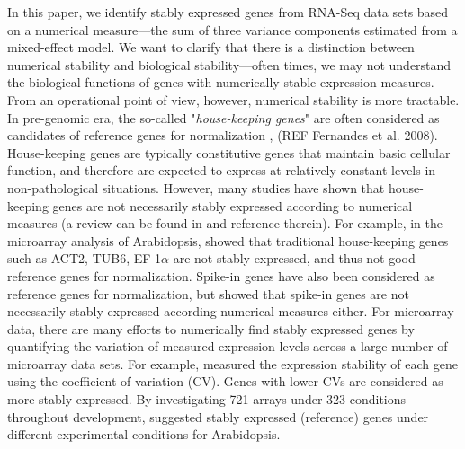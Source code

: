 \documentclass[letterpaper,12pt]{article}
\begin{document}
In this paper, we identify stably expressed genes from RNA-Seq data sets based
on a numerical measure---the sum of three variance components estimated from a
mixed-effect model.  We want to clarify that there is a distinction between
numerical stability and biological stability---often times, we may not
understand the biological functions of genes with numerically stable
expression measures.  From an operational point of view, however, numerical
stability is more tractable. In pre-genomic era, the so-called "\textit{house-keeping
genes}" are often considered as candidates of reference genes for
normalization \citep{bustin2002quantification, andersen2004normalization},
(REF Fernandes et al.  2008). House-keeping
genes are typically constitutive genes that
maintain basic cellular function, and therefore are expected to express at
relatively constant levels in non-pathological situations.  However, many
studies have shown that house-keeping
genes are not necessarily stably expressed according to
numerical measures (a review can be found in \cite{huggett2005real} and
reference therein).  For example, in the microarray analysis of Arabidopsis, \cite{czechowski2005genome}
showed that traditional house-keeping
genes such as ACT2, TUB6, EF-1$\alpha$ are not stably
expressed, and thus not good reference genes for normalization.  Spike-in
genes have also been considered as reference genes for normalization, but
\cite{risso2014nat} showed that spike-in genes are not necessarily stably
expressed according numerical measures either.  
For microarray data, there are many efforts to numerically find stably
expressed genes by quantifying the variation of measured expression levels
across a large number of microarray data sets.  For example,
\cite{czechowski2005genome} measured the expression stability of each gene
using the coefficient of variation (CV). Genes with lower CVs are considered
as more stably expressed.  By investigating 721 arrays under 323 conditions
throughout development, \cite{czechowski2005genome} suggested stably expressed
(reference) genes under different experimental conditions for Arabidopsis.
\end{document}
